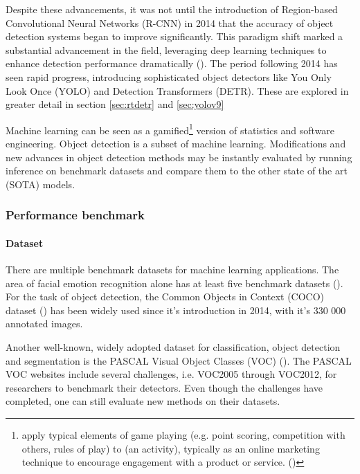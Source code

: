 Despite these advancements, it was not until the introduction of Region-based Convolutional Neural Networks (R-CNN) in 2014 that the accuracy of object detection systems began to improve significantly. This paradigm shift marked a substantial advancement in the field, leveraging deep learning techniques to enhance detection performance dramatically (\cite{zou2023object_detection_in_20_years}). The period following 2014 has seen rapid progress, introducing sophisticated object detectors like You Only Look Once (YOLO) and Detection Transformers (DETR). These are explored in greater detail in section \ref{sec:rtdetr} and \ref{sec:yolov9}

Machine learning can be seen as a gamified\footnote{apply typical elements of game playing (e.g. point scoring, competition with others, rules of play) to (an activity), typically as an online marketing technique to encourage engagement with a product or service. (\cite{ox2023gamification})} version of statistics and software engineering. Object detection is a subset of machine learning. Modifications and new advances in object detection methods may be instantly evaluated by running inference on benchmark datasets and compare them to the other state of the art (SOTA) models.

\subsubsection{Performance benchmark}
\label{sec:performance_benchmark}

\paragraph{Dataset}
There are multiple benchmark datasets for machine learning applications. The area of facial emotion recognition alone has at least five benchmark datasets (\cite{sa2022facialemotions}). For the task of object detection, the Common Objects in Context (COCO) dataset (\cite{li2014cocodataset}) has been widely used since it's introduction in 2014, with it's 330 000 annotated images.

Another well-known, widely adopted dataset for classification, object detection and segmentation is the PASCAL Visual Object Classes (VOC) (\cite{ev2010pascaldataset}). The PASCAL VOC websites include several challenges, i.e. VOC2005 through VOC2012, for researchers to benchmark their detectors. Even though the challenges have completed, one can still evaluate new methods on their datasets.

